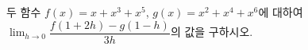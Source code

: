 두 함수 $f(x)=x+x^3+x^5$, $g(x)=x^2+x^4+x^6$에 대하여 $\displaystyle\lim_{h\to 0}\dfrac{f(1+2h)-g(1-h)}{3h}$의 값을 구하시오.
